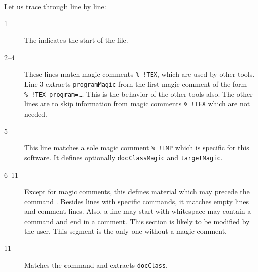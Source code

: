 
Let us trace through line by line: 
%
\begin{description}
  \item[1] The  indicates the start of the file. 
  \item[2--4] These lines match magic comments \texttt{\%~!TEX}, 
  which are used by other tools. 
  Line 3 extracts \texttt{programMagic} 
  from the first magic comment of the form \texttt{\%~!TEX program=\dots}. 
  This is the behavior of the other tools also. 
  The other lines are to skip information from magic comments \texttt{\%~!TEX} 
  which are not needed. 
  \item[5] This line matches a sole magic comment \texttt{\%~!LMP} 
  which is specific for this software. 
  It defines optionally \texttt{docClassMagic} and \texttt{targetMagic}. 
  \item[6--11] Except for magic comments, 
  this defines material which may precede the command . 
  Besides lines with specific commands, it matches empty lines and comment lines. 
  Also, a line may start with whitespace may contain a command and end in a comment. 
  This section is likely to be modified by the user. 
  This segment is the only one without a magic comment. 
  \item[11] Matches the command  
  and extracts \texttt{docClass}. 
\end{description}




